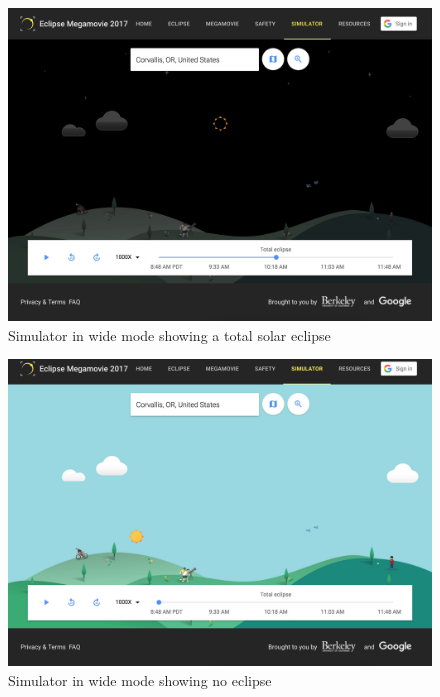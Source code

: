 \documentclass[10pt, onecolumn, draftclsnofoot, letterpaper, compsoc]{IEEEtran}
\begin{document}
\begin{figure}[!h]
	\begin{center}
  		\includegraphics[width=\textwidth]{sim_total.eps}
		\caption{Simulator in wide mode showing a total solar eclipse}
	\end{center}
\end{figure}
\newpage

\begin{figure}[!h]
	\begin{center}
			\includegraphics[width=\textwidth]{sim.eps}
		\caption{Simulator in wide mode showing no eclipse}
	\end{center}
\end{figure}
\newpage
\end{document}
